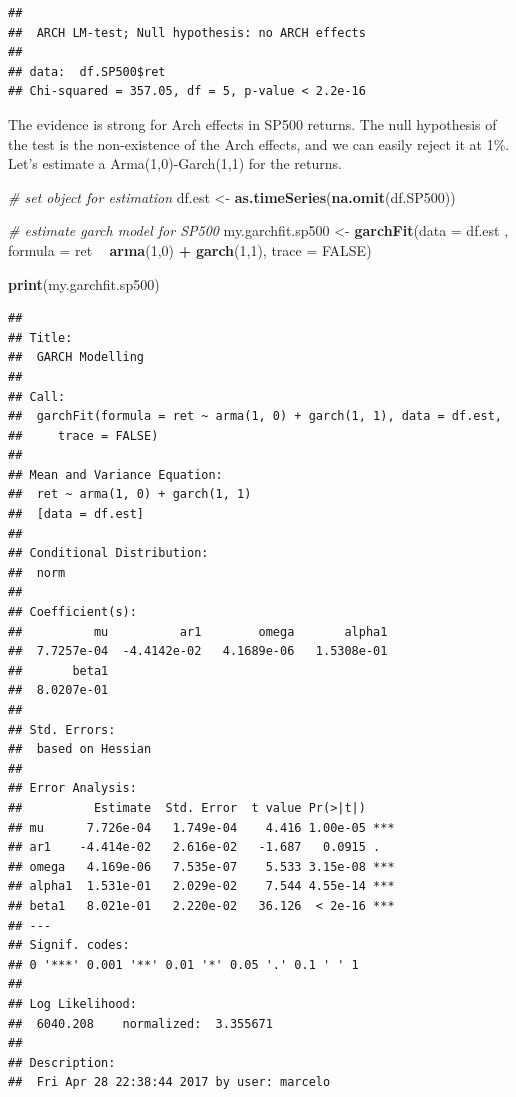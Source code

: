 \documentclass[11pt,]{book}
\newenvironment{Shaded}{\begin{snugshade}}{\end{snugshade}}
\newcommand{\KeywordTok}[1]{\textcolor[rgb]{0.27,0.27,0.27}{\textbf{#1}}}
\newcommand{\DataTypeTok}[1]{\textcolor[rgb]{0.27,0.27,0.27}{#1}}
\newcommand{\DecValTok}[1]{\textcolor[rgb]{0.06,0.06,0.06}{#1}}
\newcommand{\StringTok}[1]{\textcolor[rgb]{0.5,0.5,0.5}{#1}}
\newcommand{\CommentTok}[1]{\textcolor[rgb]{0.56,0.35,0.01}{\textit{#1}}}
\newcommand{\OtherTok}[1]{\textcolor[rgb]{0.56,0.35,0.01}{#1}}
\newcommand{\OperatorTok}[1]{\textcolor[rgb]{0.81,0.36,0.00}{\textbf{#1}}}
\newcommand{\NormalTok}[1]{#1}
\begin{document}
\begin{verbatim}
## 
##  ARCH LM-test; Null hypothesis: no ARCH effects
## 
## data:  df.SP500$ret
## Chi-squared = 357.05, df = 5, p-value < 2.2e-16
\end{verbatim}

The evidence is strong for Arch effects in SP500 returns. The null
hypothesis of the test is the non-existence of the Arch effects, and we
can easily reject it at 1\%. Let's estimate a Arma(1,0)-Garch(1,1) for
the returns.

\begin{Shaded}
\begin{Highlighting}[]
\CommentTok{# set object for estimation}
\NormalTok{df.est <-}\StringTok{ }\KeywordTok{as.timeSeries}\NormalTok{(}\KeywordTok{na.omit}\NormalTok{(df.SP500))}

\CommentTok{# estimate garch model for SP500}
\NormalTok{my.garchfit.sp500 <-}\StringTok{ }\KeywordTok{garchFit}\NormalTok{(}\DataTypeTok{data =}\NormalTok{ df.est , }
                              \DataTypeTok{formula =}\NormalTok{ ret }\OperatorTok{~}\StringTok{ }\KeywordTok{arma}\NormalTok{(}\DecValTok{1}\NormalTok{,}\DecValTok{0}\NormalTok{) }\OperatorTok{+}\StringTok{ }\KeywordTok{garch}\NormalTok{(}\DecValTok{1}\NormalTok{,}\DecValTok{1}\NormalTok{), }
                              \DataTypeTok{trace =} \OtherTok{FALSE}\NormalTok{)}

\KeywordTok{print}\NormalTok{(my.garchfit.sp500)}
\end{Highlighting}
\end{Shaded}

\begin{verbatim}
## 
## Title:
##  GARCH Modelling 
## 
## Call:
##  garchFit(formula = ret ~ arma(1, 0) + garch(1, 1), data = df.est, 
##     trace = FALSE) 
## 
## Mean and Variance Equation:
##  ret ~ arma(1, 0) + garch(1, 1)
##  [data = df.est]
## 
## Conditional Distribution:
##  norm 
## 
## Coefficient(s):
##          mu          ar1        omega       alpha1  
##  7.7257e-04  -4.4142e-02   4.1689e-06   1.5308e-01  
##       beta1  
##  8.0207e-01  
## 
## Std. Errors:
##  based on Hessian 
## 
## Error Analysis:
##          Estimate  Std. Error  t value Pr(>|t|)    
## mu      7.726e-04   1.749e-04    4.416 1.00e-05 ***
## ar1    -4.414e-02   2.616e-02   -1.687   0.0915 .  
## omega   4.169e-06   7.535e-07    5.533 3.15e-08 ***
## alpha1  1.531e-01   2.029e-02    7.544 4.55e-14 ***
## beta1   8.021e-01   2.220e-02   36.126  < 2e-16 ***
## ---
## Signif. codes:  
## 0 '***' 0.001 '**' 0.01 '*' 0.05 '.' 0.1 ' ' 1
## 
## Log Likelihood:
##  6040.208    normalized:  3.355671 
## 
## Description:
##  Fri Apr 28 22:38:44 2017 by user: marcelo
\end{verbatim}
\end{document}
